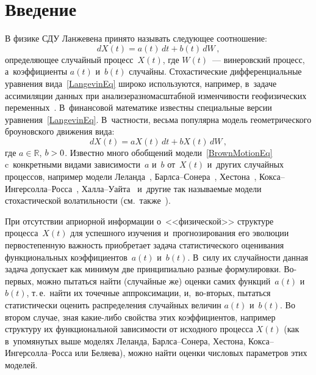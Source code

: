 



\thispagestyle{headings}

\begin{multicols}{2}

\label{st\stat}

\section{Введение}

В физике СДУ Ланжевена принято называть сле\-ду\-ющее соотношение:
\begin{equation}
\label{LangevinEq}
dX(t)=a(t)\,dt+b(t)\,dW\,,
\end{equation}
определяющее случайный процесс~$X(t)$, где $W(t)$~--- винеровский процесс, 
а~коэффициенты $a(t)$ и~$b(t)$ случайны. Стохастические дифференциальные 
уравнения вида~\eqref{LangevinEq} 
широко используются, например, в~задаче ассимиляции данных 
при анализе\linebreak раз\-но\-мас\-штаб\-ной из\-мен\-чи\-вости геофизических 
пе\-ре\-менных~\cite{Belyaev2018}. В~финансовой математике из\-вест\-ны 
специальные вер\-сии урав\-не\-ния~\eqref{LangevinEq}. 
В~частности, весьма популярна модель геометрического броуновского 
движения вида:
\begin{equation}
\label{BrownMotionEq}
dX(t)=aX(t)\,dt+b X(t)\,dW\,,
\end{equation}
где $a\in\mathbb{R}$, $b\hm>0$. Известно много обобщений 
модели~\eqref{BrownMotionEq} c~конкретными видами за\-ви\-си\-мости~$a$ и~$b$ 
от~$X(t)$ и~других случайных процессов, например модели 
Леланда~\cite{Leland1985}, Барл\-са--Со\-не\-ра~\cite{BarlesSoner1998}, 
Хестона~\cite{Heston1993}, Кок\-са--Ин\-гер\-сол\-ла--Рос\-са~\cite{CoxIngersollRoss1985}, 
Хал\-ла--Уай\-та~\cite{HullWhite1987} и~другие так называемые модели 
стохастической волатильности (см.\ 
также~\cite{DermanKani1994, Dupire1994, Shiryaev2016}).

При отсутствии априорной информации о~<<физической>> структуре процесса~$X(t)$ 
для успешного изучения и~прогнозирования его эволюции первостепенную 
важ\-ность приобретает задача  статистического оценивания функциональных 
коэффициентов~$a(t)$ и~$b(t)$. В~силу их слу\-чай\-ности данная задача допускает 
как минимум две принципиально разные формулировки. Во-пер\-вых, можно 
пытаться найти (случайные же) оценки самих функций~$a(t)$ и~$b(t)$, т.\,е.\ 
найти их точечные аппроксимации, и,~во-вто\-рых, пытаться статистически 
оценить распределения случайных величин $a(t)$ и~$b(t)$. 
Во втором случае, зная ка\-кие-ли\-бо свойства этих коэффициентов, например 
структуру их функциональной зависимости от исходного процесса $X(t)$ 
(как в~упомянутых выше моделях Леланда, Барл\-са--Со\-не\-ра, Хестона, 
Кок\-са--Ин\-гер\-сол\-ла--Рос\-са или Беляева), мож\-но \mbox{найти} оценки 
чис\-ло\-вых па\-ра\-мет\-ров этих моделей.


\end{multicols}
